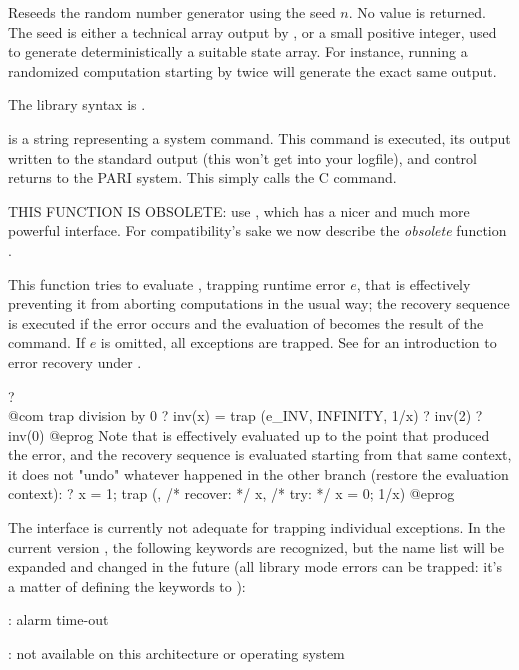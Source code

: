 \label{se:setrand}
Reseeds the random number generator using the seed $n$. No value is
returned. The seed is either a technical array output by , or a
small positive integer, used to generate deterministically a suitable state
array. For instance, running a randomized computation starting by
 twice will generate the exact same output.

The library syntax is .

\label{se:system}
 is a string representing a system command. This command is
executed, its output written to the standard output (this won't get into your
logfile), and control returns to the PARI system. This simply calls the C
 command.

\label{se:trap}
THIS FUNCTION IS OBSOLETE: use , which has a nicer and much
more powerful interface. For compatibility's sake we now describe the
\emph{obsolete} function .

This function tries to
evaluate , trapping runtime error $e$, that is effectively preventing
it from aborting computations in the usual way; the recovery sequence
 is executed if the error occurs and the evaluation of 
becomes the result of the command. If $e$ is omitted, all exceptions are
trapped. See  for an introduction to error recovery
under .

\bprog
? \\@com trap division by 0
? inv(x) = trap (e_INV, INFINITY, 1/x)
? inv(2)
? inv(0)
@eprog\noindent
Note that  is effectively evaluated up to the point that produced
the error, and the recovery sequence is evaluated starting from that same
context, it does not "undo" whatever happened in the other branch (restore
the evaluation context):
\bprog
? x = 1; trap (, /* recover: */ x, /* try: */ x = 0; 1/x)
@eprog

 The interface is currently not adequate for trapping
individual exceptions. In the current version \vers, the following keywords
are recognized, but the name list will be expanded and changed in the
future (all library mode errors can be trapped: it's a matter of defining
the keywords to ):

: alarm time-out

: not available on this architecture or operating system

